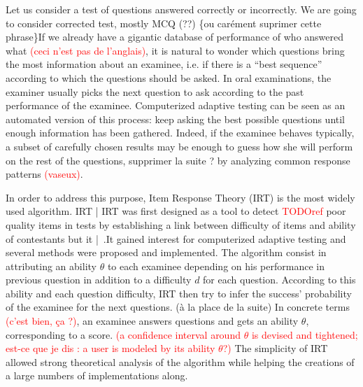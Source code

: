 \documentclass{sig-alternate}
\newcommand\alert[1]{\textcolor{red}{#1}}
\newcommand\jb[1]{\textcolor{green!50!black}{#1}}
\begin{document}
Let us consider a test of questions answered correctly or incorrectly. \jb{We are going to consider corrected test, mostly MCQ (??) \{ou carément suprimer cette phrase\}}If we already have a gigantic database of performance of who answered what \alert{(ceci n'est pas de l'anglais)}, it is natural to wonder which questions bring the most information about an examinee, i.e. if there is a ``best sequence'' according to which the questions should be asked. In oral examinations, the examiner usually picks the next question to ask according to the past performance of the examinee. Computerized adaptive testing can be seen as an automated version of this process: keep asking the best possible questions until enough information has been gathered. Indeed, if the examinee behaves typically, a subset of carefully chosen results may be enough to guess how she will perform on the rest of the questions, \jb{supprimer la suite ?} by analyzing common response patterns \alert{(vaseux)}.

\jb{In order to address this purpose, Item Response Theory (IRT) is the most widely used algorithm. IRT | IRT} was first designed as a tool to detect \alert{TODOref} poor quality items in tests by establishing a link between difficulty of items and ability of contestants \jb{but it | .It} gained interest for computerized adaptive testing and several methods were proposed and implemented. \jb{The algorithm consist in attributing an ability $\theta$ to each examinee depending on his performance in previous question in addition to a difficulty $d$ for each question. According to this ability and each question difficulty, IRT then try to infer the success' probability of the examinee for the next questions. (à la place de la suite)} In concrete terms \alert{(c'est bien, ça ?)}, an examinee answers questions and gets an ability $\theta$, corresponding to a score. \alert{(a confidence interval around $\theta$ is devised and tightened; est-ce que je dis : a user is modeled by its ability $\theta$?)} \jb{The simplicity of IRT allowed strong theoretical analysis of the algorithm while helping the creations of a large numbers of implementations along.} 
\end{document}

